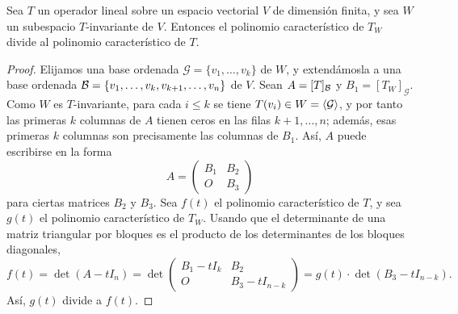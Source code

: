 \documentclass[12pt,a4paper]{book}
\begin{document}
    \begin{teorema}
        Sea $T$ un operador lineal sobre un espacio vectorial $V$ de dimensión finita, y sea $W$ un subespacio $T$-invariante de $V$. Entonces el polinomio característico de $T_W$ divide al polinomio característico de $T$.
    \end{teorema}

    \begin{proof}
        Elijamos una base ordenada $\mathcal{G}=\{v_1,\dots,v_k\}$ de $W$, y extendámosla a una base ordenada $\mathcal{B}=\{v_1,\dots,v_k,v_{k+1},\dots,v_n\}$ de $V$. Sean $A=[T]_{\mathcal{B}}$ y $B_1=[T_W]_{\mathcal{G}}$. Como $W$ es $T$-invariante, para cada $i\leq k$ se tiene $T(v_i)\in W=\langle \mathcal{G} \rangle$, y por tanto las primeras $k$ columnas de $A$ tienen ceros en las filas $k+1,\dots,n$; además, esas primeras $k$ columnas son precisamente las columnas de $B_1$. Así, $A$ puede escribirse en la forma
        \begin{equation*}
            A=\begin{pmatrix}B_1&B_2\\O&B_3\end{pmatrix}
        \end{equation*}
        para ciertas matrices $B_2$ y $B_3$. Sea $f(t)$ el polinomio característico de $T$, y sea $g(t)$ el polinomio característico de $T_W$. Usando que el determinante de una matriz triangular por bloques es el producto de los determinantes de los bloques diagonales,
        \begin{equation*}
            f(t)=\det(A-tI_n)=\det\begin{pmatrix}B_1-tI_k&B_2\\O&B_3-tI_{n-k}\end{pmatrix}=g(t)\cdot\det(B_3-tI_{n-k}).
        \end{equation*}
        Así, $g(t)$ divide a $f(t)$.
    \end{proof}
\end{document}
